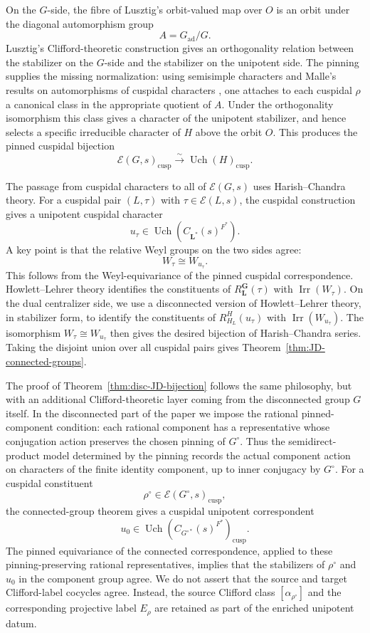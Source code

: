 \documentclass{amsart}
\theoremstyle{plain}
\numberwithin{equation}{section}
\theoremstyle{definition}
\newcommand{\cE}{\mathcal{E}}
\newcommand{\Irr}{\operatorname{Irr}}
\newcommand{\Uch}{\operatorname{Uch}}
\newcommand{\ad}{\operatorname{ad}}
\newcommand{\cusp}{\operatorname{cusp}}
\newcommand{\bG}{\mathbf{G}}
\newcommand{\bL}{\mathbf{L}}
\begin{document}
On the \(G\)-side, the fibre of Lusztig's orbit-valued map over \(O\) is an
orbit under the diagonal automorphism group
\[
A=G_{\ad}/G.
\]
Lusztig's Clifford-theoretic construction gives an orthogonality relation
between the stabilizer on the \(G\)-side and the stabilizer on the unipotent
side.  The pinning supplies the missing normalization: using semisimple
characters and Malle's results on automorphisms of cuspidal characters
\cite{Malle2017}, one attaches to each cuspidal \(\rho\) a canonical class in
the appropriate quotient of \(A\).  Under the orthogonality isomorphism this
class gives a character of the unipotent stabilizer, and hence selects a
specific irreducible character of \(H\) above the orbit \(O\).  This produces
the pinned cuspidal bijection
\[
\cE(G,s)_{\cusp}\xrightarrow{\sim}\Uch(H)_{\cusp}.
\]

The passage from cuspidal characters to all of \(\cE(G,s)\) uses
Harish--Chandra theory.  For a cuspidal pair \((L,\tau)\) with
\(\tau\in\cE(L,s)\), the cuspidal construction gives a unipotent cuspidal
character
\[
u_\tau\in\Uch(C_{\bL^*}(s)^{F^*}).
\]
A key point is that the relative Weyl groups on the two sides agree:
\[
W_\tau \cong W_{u_\tau}.
\]
This follows from the Weyl-equivariance of the pinned cuspidal correspondence.
Howlett--Lehrer theory identifies the constituents of
\(R_{\bL}^{\bG}(\tau)\) with \(\Irr(W_\tau)\).  On the dual centralizer side,
we use a disconnected version of Howlett--Lehrer theory, in stabilizer form,
to identify the constituents of
\(R_{H_L}^{H}(u_\tau)\) with \(\Irr(W_{u_\tau})\).  The isomorphism
\(W_\tau\cong W_{u_\tau}\) then gives the desired bijection of Harish--Chandra
series.  Taking the disjoint union over all cuspidal pairs gives
Theorem~\ref{thm:JD-connected-groups}.

The proof of Theorem~\ref{thm:disc-JD-bijection} follows the same philosophy,
but with an additional Clifford-theoretic layer coming from the disconnected
group \(G\) itself.  In the disconnected part of the paper we impose the
rational pinned-component condition: each rational component has a representative
whose conjugation action preserves the chosen pinning of \(G^\circ\).  Thus the
semidirect-product model determined by the pinning records the actual component
action on characters of the finite identity component, up to inner conjugacy by
\(G^\circ\).  For a cuspidal constituent
\[
\rho^\circ\in\cE(G^\circ,s)_{\cusp},
\]
the connected-group theorem gives a cuspidal unipotent correspondent
\[
u_0\in\Uch(C_{G^{\circ *}}(s)^{F^*})_{\cusp}.
\]
The pinned equivariance of the connected correspondence, applied to these
pinning-preserving rational representatives, implies that the stabilizers of
\(\rho^\circ\) and \(u_0\) in the component group agree.  We do not assert that
the source and target Clifford-label cocycles agree.  Instead, the source Clifford
class \([\alpha_{\rho^\circ}]\) and the corresponding projective label \(E_\rho\)
are retained as part of the enriched unipotent datum.
\end{document}
